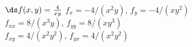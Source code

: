 {$\ds f(x,y) = \frac 4{xy}$
}
{$f_x=-4/(x^2y)$, $f_y=-4/(xy^2)$\\
$f_{xx}=8/(x^3y)$, $f_{yy}=8/(xy^3)$\\
$f_{xy}=4/(x^2y^2)$, $f_{yx}=4/(x^2y^2)$\\
}